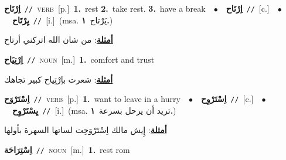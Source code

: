 \documentclass[10pt,a4paper,twoside]{article} %
\begin{document}
\begin{multicols}{2}
{\setlength\topsep{0pt}\textbf{\foreignlanguage{arabic}{اِرْتَاح}}\ {\color{gray}\texttt{//}\color{black}}\ \textsc{verb}\ [p.]\ \textbf{1.}~rest  \textbf{2.}~take rest.  \textbf{3.}~have a break\ \ $\bullet$\ \ \setlength\topsep{0pt}\textbf{\foreignlanguage{arabic}{اِرْتَاح}}\ {\color{gray}\texttt{//}\color{black}}\ [c.]\ \ $\bullet$\ \ \setlength\topsep{0pt}\textbf{\foreignlanguage{arabic}{يِرْتَاح}}\ {\color{gray}\texttt{//}\color{black}}\ [i.]\ \color{gray}(msa. \foreignlanguage{arabic}{يَرْتاح}~\foreignlanguage{arabic}{\textbf{١.}})\color{black}\  \begin{flushright}\color{gray}\foreignlanguage{arabic}{\textbf{\underline{\foreignlanguage{arabic}{أمثلة}}}: من شان الله اتركني أرتاح}\end{flushright}\color{black}} \vspace{2mm}

{\setlength\topsep{0pt}\textbf{\foreignlanguage{arabic}{اِرْتِيَاح}}\ {\color{gray}\texttt{//}\color{black}}\ \textsc{noun}\ [m.]\ \textbf{1.}~comfort and trust\  \begin{flushright}\color{gray}\foreignlanguage{arabic}{\textbf{\underline{\foreignlanguage{arabic}{أمثلة}}}: شعرت باِرْتِياح كبير تجاهك}\end{flushright}\color{black}} \vspace{2mm}

{\setlength\topsep{0pt}\textbf{\foreignlanguage{arabic}{اِسْتَرْوَح}}\ {\color{gray}\texttt{//}\color{black}}\ \textsc{verb}\ [p.]\ \textbf{1.}~want to leave in a hurry\ \ $\bullet$\ \ \setlength\topsep{0pt}\textbf{\foreignlanguage{arabic}{اِسْتَرْوِح}}\ {\color{gray}\texttt{//}\color{black}}\ [c.]\ \ $\bullet$\ \ \setlength\topsep{0pt}\textbf{\foreignlanguage{arabic}{يِسْتَرْوِح}}\ {\color{gray}\texttt{//}\color{black}}\ [i.]\ \color{gray}(msa. \foreignlanguage{arabic}{تريد أن يرحل بسرعة}~\foreignlanguage{arabic}{\textbf{١.}})\color{black}\  \begin{flushright}\color{gray}\foreignlanguage{arabic}{\textbf{\underline{\foreignlanguage{arabic}{أمثلة}}}: إِيش مالك اِسْتَرْوَحِت لساتها السهرة بأولها}\end{flushright}\color{black}} \vspace{2mm}

{\setlength\topsep{0pt}\textbf{\foreignlanguage{arabic}{اِسْتِرَاحَة}}\ {\color{gray}\texttt{//}\color{black}}\ \textsc{noun}\ [m.]\ \textbf{1.}~rest rom\ } \vspace{2mm}


\end{multicols}
\end{document}
